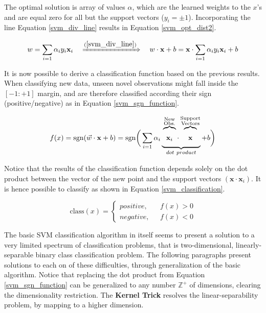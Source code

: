 	The optimal solution is array of values $\alpha$, which are the learned weights to the $x$'s and are equal zero for all but the support vectors ($y_i = \pm1 $). Incorporating the line Equation \ref{svm_div_line} results in Equation \ref{svm_opt_dist2}.
	
	\begin{equation}
		w = \sum_{i=1}\alpha_i y_i \textbf{x}_i \ \ \ \xRightarrow[]{(\ref{svm_div_line})}
		\ \ \ w \cdot \textbf{x} + b = \textbf{x} \cdot  \sum_{i=1} \alpha_i y_i \textbf{x}_i  + b
		\label{svm_opt_dist2}
	\end{equation}
	
	It is now possible to derive a classification function based on the previous results. When classifying new data, unseen novel observations might fall inside the $[-1:+1]$ margin, and are therefore classified according their sign (positive/negative) as in Equation \ref{svm_sgn_function}.
	
	\begin{equation}
		f(x) = \text{sgn}(\vec{w} \cdot \textbf{x} + b)  =
		\text{sgn}\bigg( \sum_{i=1} \alpha_i
		\xunderbrace{
		 \xoverbrace{\textbf{x}_i}^{\substack{\text{New}\\ \text{Obs.}}}
	  \cdot 
	  \xoverbrace{\textbf{x}}^{\substack{\text{Support}\\ \text{Vectors}}}
		}_{dot \ product}
		 + b \bigg)
		\label{svm_sgn_function} 
	\end{equation}
	
	Notice that the results of the classification function depends solely on the dot product between the vector of the new point and the support vectors $(\textbf{x} \cdot\textbf{x}_i)$. It is hence possible to classify as shown in Equation \ref{svm_classification}.
	
	\begin{equation}
		\text{class}(x) = 
		\begin{cases}
			positive,\ \ \  &f(x) > 0 \\
			negative,\ \ \  &f(x) < 0
		\end{cases}
		\label{svm_classification}
	\end{equation}
	
	The basic SVM classification algorithm in itself seems to present a solution to a very limited spectrum of classification problems, that is two-dimensional, linearly-separable binary class classification problem. The following paragraphs present solutions to each on of these difficulties, through generalization of the basic algorithm. Notice that replacing the dot product from Equation \ref{svm_sgn_function} can be generalized to any number $\mathbb{Z}^+$ of dimensions, clearing the dimensionality restriction. The \textbf{Kernel Trick} resolves the linear-separability problem, by mapping to a higher dimension.
		
